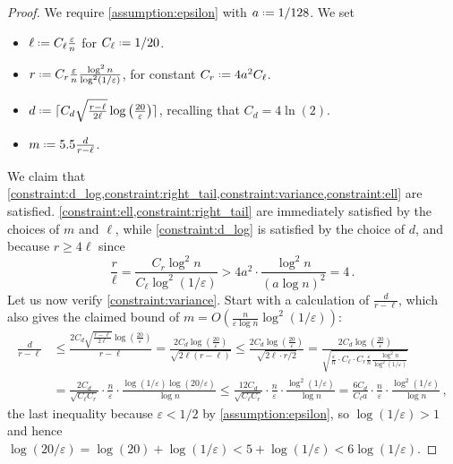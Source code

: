 \documentclass{theoretics}
\newcommand*{\define}{\mathrel{\vcenter{\baselineskip0.5ex \lineskiplimit0pt
                      \hbox{\scriptsize.}\hbox{\scriptsize.}}}%
                      =}
\newcommand{\ceil}[1]{\ensuremath{\lceil #1 \rceil}}
\renewcommand{\epsilon}{\varepsilon}
\begin{document}
\begin{proof}
    We require \cref{assumption:epsilon} with $a \define 1/128$. We set
    \begin{itemize}
        \item $\ell \define C_\ell \frac{\epsilon}{n}$ for $C_\ell \define 1/20$.
        \item $r \define C_r \frac{\epsilon}{n} \frac{\log^2 n}{\log^2(1/\epsilon)}$, for constant
            $C_r \define 4 a^2 C_\ell$.
        \item $d \define \ceil{C_d \sqrt{\frac{r-\ell}{2\ell}} \log \left(\frac{20}{\epsilon}
            \right)}$, recalling that $C_d = 4\ln(2)$.
        \item $m \define 5.5 \frac{d}{r-\ell}$.
    \end{itemize}
    We claim that \cref{constraint:d_log,constraint:right_tail,constraint:variance,constraint:ell}
    are satisfied. \cref{constraint:ell,constraint:right_tail} are immediately satisfied by the
    choices of $m$ and $\ell$, while \cref{constraint:d_log} is satisfied by the choice of $d$, and
    because $r \ge 4\ell$ since
    \[
        \frac{r}{\ell} = \frac{C_r \log^2 n}{C_\ell \log^2(1/\epsilon)}
        > 4 a^2 \cdot \frac{\log^2 n}{(a \log n)^2}
        = 4 \,.
    \]
    Let us now verify \cref{constraint:variance}. Start with a calculation of
$\tfrac{d}{r-\ell}$, which also gives the claimed bound of $m = O(\tfrac{n}{\epsilon \log
n}\log^2(1/\epsilon))$:
    \begin{align*}
        \frac{d}{r-\ell}
        &\le \frac{2C_d \sqrt{\frac{r-\ell}{2\ell}} \log \left(\frac{20}{\epsilon} \right)}{r-\ell}
        = \frac{2C_d \log \left(\frac{20}{\epsilon} \right)}{\sqrt{2\ell(r-\ell)}}
        \le \frac{2C_d \log \left(\frac{20}{\epsilon} \right)}{\sqrt{2\ell \cdot r/2}}
        = \frac{2C_d \log \left(\frac{20}{\epsilon} \right)}{
            \sqrt{\frac{\epsilon}{n} \cdot C_\ell \cdot
                C_r \frac{\epsilon}{n} \frac{\log^2 n}{\log^2(1/\epsilon)}}} \\
        &= \frac{2C_d}{\sqrt{C_\ell C_r}} \cdot \frac{n}{\epsilon} \cdot \frac{\log(1/\epsilon) \log(20/\epsilon)}{\log n} 
        \leq \frac{12 C_d}{\sqrt{C_\ell C_r}} \cdot \frac{n}{\epsilon} \cdot \frac{\log^2(1/\epsilon)}{\log n} 
        = \frac{6 C_d}{C_\ell a} \cdot \frac{n}{\epsilon} \cdot \frac{\log^2(1/\epsilon)}{\log n} \,,
    \end{align*}
    the last inequality because $\epsilon < 1/2$ by \cref{assumption:epsilon}, so $\log(1/\epsilon)
    > 1$ and hence $\log(20/\epsilon) = \log(20) + \log(1/\epsilon) < 5 + \log(1/\epsilon) <
    6\log(1/\epsilon)$.


\end{proof}
\end{document}
